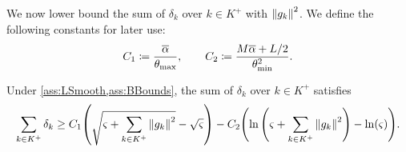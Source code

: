 \documentclass[journal]{subfiles}
\begin{document}
We now lower bound the sum of $\delta_k$ over $k \in K^+$ with $\norm{g_{k}}^2$.
We define the following constants for later use:
\begin{equation*}
    C_1 \coloneqq \frac{\overline{\alpha}}{\theta_{\max}}, \qquad
    C_2 \coloneqq \frac{M\overline{\alpha}+L/2}{\theta_{\min}^2}.
\end{equation*}
\begin{lemma}\label{lem:sum_small_delta_k_bound_Kplus}
    Under \cref{ass:LSmooth,ass:BBounds}, the sum of $\delta_k$ over $k \in K^+$ satisfies
    \begin{equation*}
        \sum_{k \in K^+} \delta_k \ge
        C_1 \qty(\sqrt{\varsigma + \sum_{k \in K^+} \norm{g_{k}}^2} - \sqrt{\varsigma})
        - C_2 \qty(\ln\qty(\varsigma+\sum_{k \in K^+} \norm{g_{k}}^2) - \ln(\varsigma)).
    \end{equation*}
\end{lemma}
\end{document}
